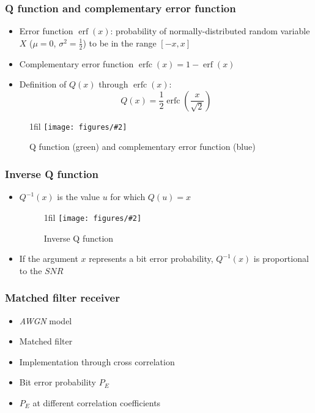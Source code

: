 \documentclass{beamer}
\makeatletter
\newcommand*{\centerfloat}{%
  \parindent \z@
  \leftskip \z@ \@plus 1fil \@minus \textwidth
  \rightskip\leftskip
  \parfillskip \z@skip}
\newcommand{\fig}[3]{
  \begin{figure}[H]
  \centerfloat
    \texttt{[image: figures/\#2]}
	\caption{#3}
  \end{figure}
}
\makeatother
\begin{document}
\begin{frame}
	\frametitle{Q function and complementary error function}
	\begin{itemize}
		\item Error function $\operatorname{erf}(x)$: probability of normally-distributed random variable $X$ ($\mu = 0$, $\sigma^2 = \frac{1}{2}$) to be in the range $[-x, x]$
		\item Complementary error function $\operatorname{erfc}(x) = 1 - \operatorname{erf}(x)$
		\item Definition of $Q(x)$ through $\operatorname{erfc}(x)$:
		\begin{equation}
			Q(x) = \frac{1}{2}\operatorname{erfc} \left(\frac{x}{\sqrt{2}} \right)
		\end{equation}
	\end{itemize}
	\fig{2cm}{q3.png}{Q function (green) and complementary error function (blue)}
\end{frame}

\begin{frame}
	\frametitle{Inverse Q function}
	\begin{itemize}
		\item $Q^{-1}(x)$ is the value $u$ for which $Q(u) = x$
		\fig{2cm}{q2.png}{Inverse Q function}
		\item If the argument $x$ represents a bit error probability, $Q^{-1}(x)$ is proportional to the $SNR$
	\end{itemize}
\end{frame}


\begin{frame}
	\frametitle{Matched filter receiver}
	\begin{itemize}
		\item \emph{AWGN} model
		\item Matched filter
		\item Implementation through cross correlation
		\item Bit error probability $P_E$
		\item $P_E$ at different correlation coefficients
	\end{itemize}
\end{frame}
\end{document}

